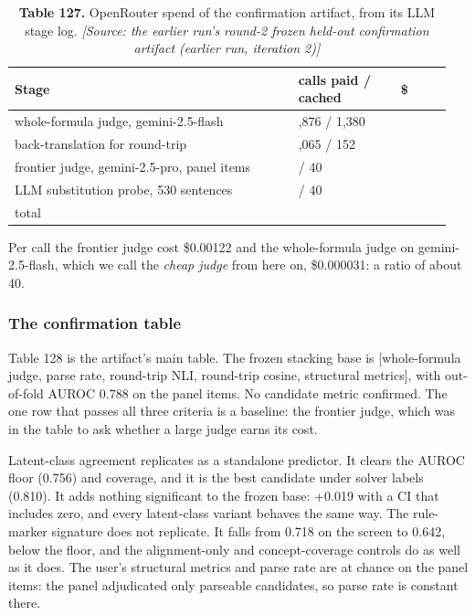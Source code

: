 \documentclass[11pt,letterpaper]{article}
\begin{document}
\begin{table}[H]
\centering
\small
\setlength{\tabcolsep}{3pt}
\caption*{\textbf{Table 127.} OpenRouter spend of the confirmation artifact, from its LLM stage log. \textit{[Source: the earlier run's round-2 frozen held-out confirmation artifact (earlier run, iteration 2)]}}
\begin{tabular}{>{\raggedright\arraybackslash}p{0.611\linewidth}>{\raggedright\arraybackslash}p{0.226\linewidth}>{\raggedright\arraybackslash}p{0.115\linewidth}}
\toprule
\textbf{Stage} & \textbf{calls paid / cached} & \textbf{\$} \\
\midrule
{}whole-formula judge, gemini-2.5-flash & 5,876 / 1,380 & 0.184 \\
{}back-translation for round-trip & 1,065 / 152 & 0.127 \\
{}frontier judge, gemini-2.5-pro, panel items & 569 / 40 & 0.672 \\
{}LLM substitution probe, 530 sentences & 542 / 40 & 1.709 \\
{}total &  & 2.70 \\
\bottomrule
\end{tabular}
\end{table}

Per call the frontier judge cost \$0.00122 and the whole-formula judge on gemini-2.5-flash, which we call the \emph{cheap judge} from here on, \$0.000031: a ratio of about 40.

\subsubsection{The confirmation table}

Table 128 is the artifact's main table. The frozen stacking base is [whole-formula judge, parse rate, round-trip NLI, round-trip cosine, structural metrics], with out-of-fold AUROC 0.788 on the panel items. No candidate metric confirmed. The one row that passes all three criteria is a baseline: the frontier judge, which was in the table to ask whether a large judge earns its cost.

Latent-class agreement replicates as a standalone predictor. It clears the AUROC floor (0.756) and coverage, and it is the best candidate under solver labels (0.810). It adds nothing significant to the frozen base: +0.019 with a CI that includes zero, and every latent-class variant behaves the same way. The rule-marker signature does not replicate. It falls from 0.718 on the screen to 0.642, below the floor, and the alignment-only and concept-coverage controls do as well as it does. The user's structural metrics and parse rate are at chance on the panel items: the panel adjudicated only parseable candidates, so parse rate is constant there.
\end{document}
